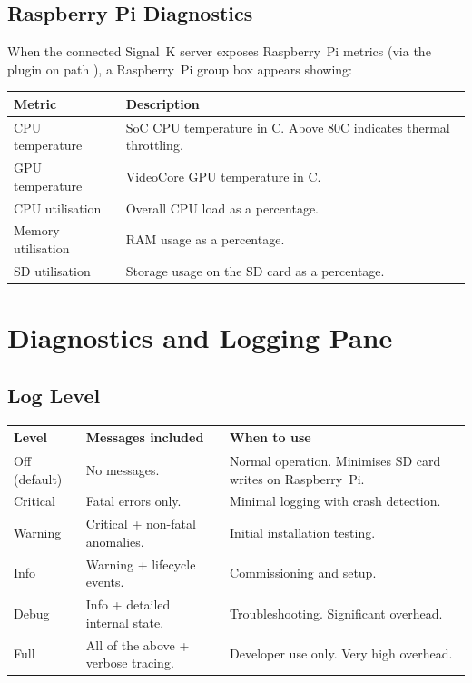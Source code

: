 \subsection{Raspberry Pi Diagnostics}

When the connected Signal~K server exposes Raspberry~Pi metrics
(via the  plugin on path ),
a Raspberry~Pi group box appears showing:

\begin{longtable}{L{3.6cm}L{10.1cm}}
\toprule
{}
\color{white}\sffamily\bfseries Metric &
\color{white}\sffamily\bfseries Description \\
\midrule
CPU temperature   & SoC CPU temperature in \textdegree{}C. Above 80\textdegree{}C indicates thermal throttling. \\
GPU temperature   & VideoCore GPU temperature in \textdegree{}C. \\
CPU utilisation   & Overall CPU load as a percentage. \\
Memory utilisation& RAM usage as a percentage. \\
SD utilisation    & Storage usage on the SD card as a percentage. \\
\bottomrule
\end{longtable}

\section{Diagnostics and Logging Pane}


\subsection{Log Level}

\begin{longtable}{L{2.4cm}L{4.6cm}L{6.7cm}}
\toprule
{}
\color{white}\sffamily\bfseries Level &
\color{white}\sffamily\bfseries Messages included &
\color{white}\sffamily\bfseries When to use \\
\midrule
Off (default) & No messages. & Normal operation. Minimises SD card writes on Raspberry~Pi. \\
Critical      & Fatal errors only. & Minimal logging with crash detection. \\
Warning       & Critical + non-fatal anomalies. & Initial installation testing. \\
Info          & Warning + lifecycle events. & Commissioning and setup. \\
Debug         & Info + detailed internal state. & Troubleshooting. Significant overhead. \\
Full          & All of the above + verbose tracing. & Developer use only. Very high overhead. \\
\bottomrule
\end{longtable}

